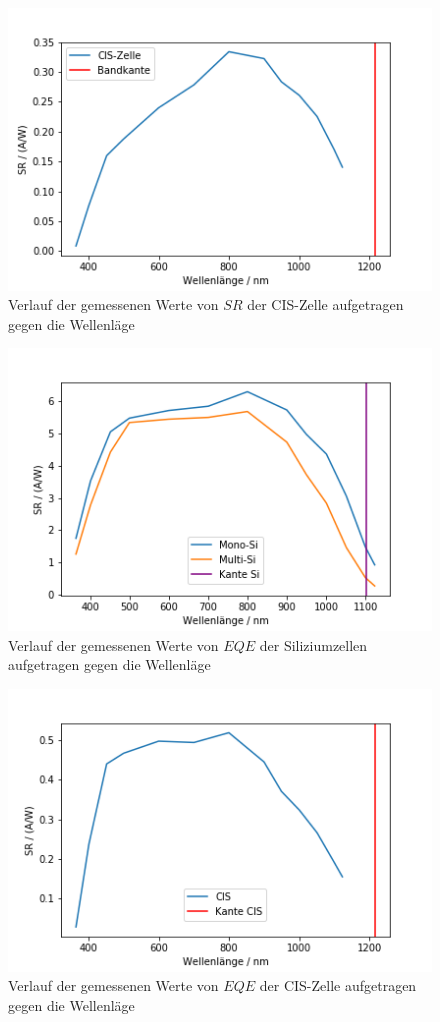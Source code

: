 \begin{figure}[h]
    \centering
    \includegraphics[scale=0.75]{Bilder/32CISSR.png}
    \caption{Verlauf der gemessenen Werte von $SR$ der CIS-Zelle aufgetragen gegen die Wellenläge}
    \label{bild:CISSR}
\end{figure}



\begin{figure}[ht]
    \centering
    \includegraphics[scale=0.75]{Bilder/32SiEQE.png}
    \caption{Verlauf der gemessenen Werte von $EQE$ der Siliziumzellen aufgetragen gegen die Wellenläge}
    \label{bild:SiEQE}
\end{figure}

\begin{figure}[ht]
    \centering
    \includegraphics[scale=0.75]{Bilder/32CISEQE.png}
    \caption{Verlauf der gemessenen Werte von $EQE$ der CIS-Zelle aufgetragen gegen die Wellenläge}
    \label{bild:CISEQE}
\end{figure}

